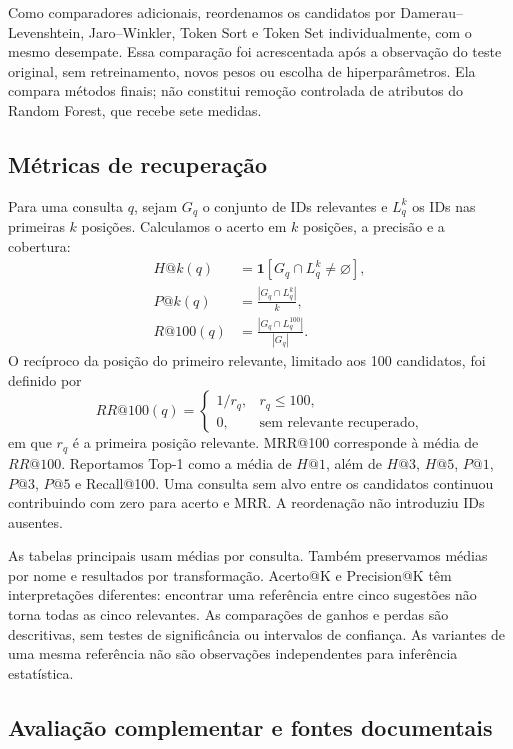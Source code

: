 Como comparadores adicionais, reordenamos os candidatos por Damerau--Levenshtein, Jaro--Winkler, Token Sort e Token Set individualmente, com o mesmo desempate. Essa comparação foi acrescentada após a observação do teste original, sem retreinamento, novos pesos ou escolha de hiperparâmetros. Ela compara métodos finais; não constitui remoção controlada de atributos do Random Forest, que recebe sete medidas.

\subsection{Métricas de recuperação}

Para uma consulta $q$, sejam $G_q$ o conjunto de IDs relevantes e $L_q^k$ os IDs nas primeiras $k$ posições. Calculamos o acerto em $k$ posições, a precisão e a cobertura:
\begin{align}
 H@k(q) &= \mathbf{1}[G_q\cap L_q^k\ne\varnothing],\\
 P@k(q) &= \frac{|G_q\cap L_q^k|}{k},\\
 R@100(q) &= \frac{|G_q\cap L_q^{100}|}{|G_q|}.
\end{align}
O recíproco da posição do primeiro relevante, limitado aos 100 candidatos, foi definido por
\begin{equation}
 RR@100(q)=\begin{cases}1/r_q,&r_q\leq100,\\0,&\text{sem relevante recuperado},\end{cases}
\end{equation}
em que $r_q$ é a primeira posição relevante. MRR@100 corresponde à média de $RR@100$. Reportamos Top-1 como a média de $H@1$, além de $H@3$, $H@5$, $P@1$, $P@3$, $P@5$ e Recall@100. Uma consulta sem alvo entre os candidatos continuou contribuindo com zero para acerto e MRR. A reordenação não introduziu IDs ausentes.

As tabelas principais usam médias por consulta. Também preservamos médias por nome e resultados por transformação. Acerto@K e Precision@K têm interpretações diferentes: encontrar uma referência entre cinco sugestões não torna todas as cinco relevantes. As comparações de ganhos e perdas são descritivas, sem testes de significância ou intervalos de confiança. As variantes de uma mesma referência não são observações independentes para inferência estatística.

\subsection{Avaliação complementar e fontes documentais}

